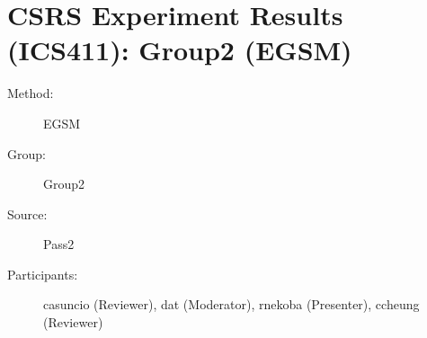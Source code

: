\chapter {CSRS Experiment Results (ICS411): Group2 (EGSM)}
\small
	  

\begin{description}
\item [Method:] EGSM
\item [Group:] Group2
\item [Source:] Pass2
\item [Participants:] casuncio (Reviewer), dat (Moderator), rnekoba (Presenter), ccheung (Reviewer)
\end{description}
